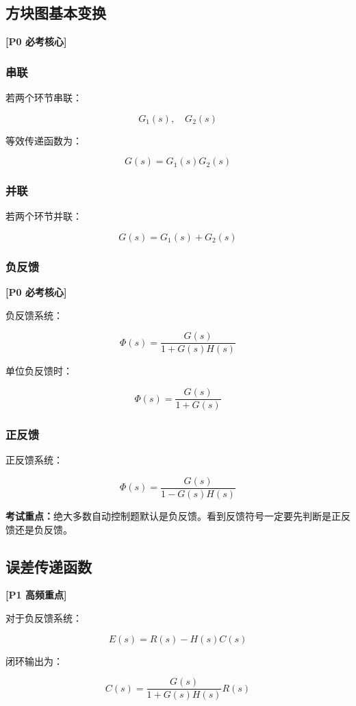 \documentclass[UTF8,a4paper,12pt]{ctexart}
\newcommand{\Pzero}{\textcolor{p0}{\textbf{[P0 必考核心]}}}
\newcommand{\Pone}{\textcolor{p1}{\textbf{[P1 高频重点]}}}
\newcommand{\exam}{\textcolor{p0}{\textbf{考试重点：}}}
\begin{document}
\subsection{方块图基本变换}

\Pzero

\subsubsection{串联}

若两个环节串联：

\[
G_1(s),\quad G_2(s)
\]

等效传递函数为：

\[
G(s)=G_1(s)G_2(s)
\]

\subsubsection{并联}

若两个环节并联：

\[
G(s)=G_1(s)+G_2(s)
\]

\subsubsection{负反馈}

\Pzero

负反馈系统：

\[
\Phi(s)=\frac{G(s)}{1+G(s)H(s)}
\]

单位负反馈时：

\[
\Phi(s)=\frac{G(s)}{1+G(s)}
\]

\subsubsection{正反馈}

正反馈系统：

\[
\Phi(s)=\frac{G(s)}{1-G(s)H(s)}
\]

\exam 绝大多数自动控制题默认是负反馈。看到反馈符号一定要先判断是正反馈还是负反馈。

\subsection{误差传递函数}

\Pone

对于负反馈系统：

\[
E(s)=R(s)-H(s)C(s)
\]

闭环输出为：

\[
C(s)=\frac{G(s)}{1+G(s)H(s)}R(s)
\]
\end{document}
